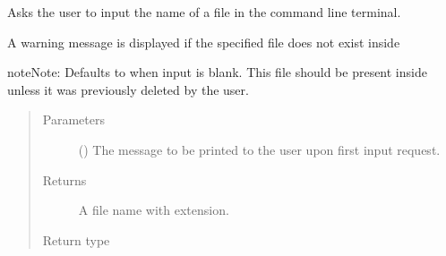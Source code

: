 \documentclass[letterpaper,10pt,english]{sphinxmanual}
\begin{document}
\begin{fulllineitems}
\label{\detokenize{app:app.simfile_generator._input_filename}}
Asks the user to input the name of a file in the command line terminal.

A warning message is displayed if the specified file does not exist inside
{\hyperref[\detokenize{app:app.environment_settings.SHARED_ROOT}]{}}

\begin{sphinxadmonition}{note}{Note:}
Defaults to  when input is blank. This file should
be present inside {\hyperref[\detokenize{app:app.environment_settings.SHARED_ROOT}]{}}
unless it was previously deleted by the user.
\end{sphinxadmonition}
\begin{quote}\begin{description}
\item[{Parameters}] \leavevmode
{} () \textendash{} The message to be printed to the user upon first input request.

\item[{Returns}] \leavevmode
A file name with extension.

\item[{Return type}] \leavevmode
{}

\end{description}\end{quote}

\end{fulllineitems}

\end{document}
